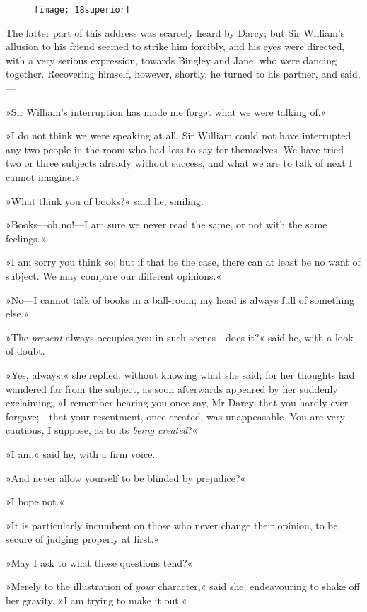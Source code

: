 \begin{figure}[tbh]
\centering
\texttt{[image: 18superior]}
\end{figure}

The latter part of this address was scarcely heard by Darcy; but Sir William's allusion to his friend seemed to strike him forcibly, and his eyes were directed, with a very serious expression, towards Bingley and Jane, who were dancing together. Recovering himself, however, shortly, he turned to his partner, and said,—

»Sir William's interruption has made me forget what we were talking of.«

»I do not think we were speaking at all. Sir William could not have interrupted any two people in the room who had less to say for themselves. We have tried two or three subjects already without success, and what we are to talk of next I cannot imagine.«

»What think you of books?« said he, smiling.

»Books—oh no!—I am sure we never read the same, or not with the same feelings.«

»I am sorry you think so; but if that be the case, there can at least be no want of subject. We may compare our different opinions.«

»No—I cannot talk of books in a ball-room; my head is always full of something else.«

»The \textit{present} always occupies you in such scenes—does it?« said he, with a look of doubt.

»Yes, always,« she replied, without knowing what she said; for her thoughts had wandered far from the subject, as soon afterwards appeared by her suddenly exclaiming, »I remember hearing you once say, Mr Darcy, that you hardly ever forgave;—that your resentment, once created, was unappeasable. You are very cautious, I suppose, as to its \textit{being created}?«

»I am,« said he, with a firm voice.

»And never allow yourself to be blinded by prejudice?«

»I hope not.«

»It is particularly incumbent on those who never change their opinion, to be secure of judging properly at first.«

»May I ask to what these questions tend?«

»Merely to the illustration of \textit{your} character,« said she, endeavouring to shake off her gravity. »I am trying to make it out.«

